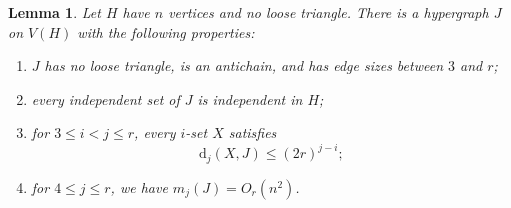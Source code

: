\documentclass[11pt]{article}
\numberwithin{equation}{section}
\newtheorem{lemma}[theorem]{Lemma}
\theoremstyle{remark}
\newcommand{\dd}{\mathrm d}
\begin{document}
\begin{lemma}\label{lem:compression}
Let $H$ have $n$ vertices and no loose triangle. There is a hypergraph $J$ on $V(H)$ with the following properties:
\begin{enumerate}[label=\textup{(\roman*)}]
\item $J$ has no loose triangle, is an antichain, and has edge sizes between $3$ and $r$;
\item every independent set of $J$ is independent in $H$;
\item for $3\le i<j\le r$, every $i$-set $X$ satisfies
\begin{equation}\label{eq:bounded-codegrees}
 \dd_j(X,J)\le(2r)^{j-i};
\end{equation}
\item for $4\le j\le r$, we have $m_j(J)=O_r(n^2)$.
\end{enumerate}
\end{lemma}
\end{document}
